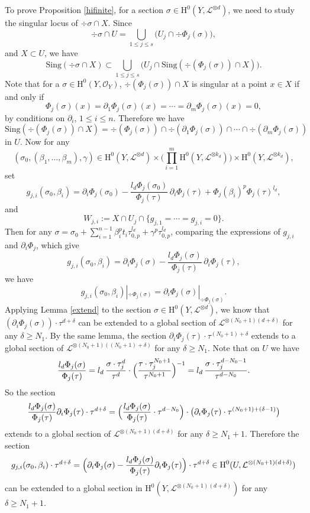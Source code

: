 \documentclass[11pt]{article}
\numberwithin{equation}{section}
\theoremstyle{plain}
\theoremstyle{definition}
\newcommand{\ho}{\mathrm{H}}
\newcommand{\li}{\mathcal{L}}
\begin{document}
To prove Proposition \ref{hifinite}, for a section $\sigma\in \ho^0(Y, \mathcal{L}^{\otimes d})$, we need to study the singular locus of $\div \sigma\cap X$. Since
\[
\div \sigma \cap U=\bigcup_{1\leq j\leq s}\bigl(U_j\cap \div \Phi_j(\sigma) \bigr),
\]
and $X\subset U$, we have
\[
\mathrm{Sing}(\div \sigma\cap X)\subset \bigcup_{1\leq j\leq s}\bigl(U_j\cap \mathrm{Sing}(\div (\Phi_j(\sigma))\cap X) \bigr).
\]
Note that for a $\sigma\in \ho^0(Y, \mathcal{O}_Y)$, $\div (\Phi_j(\sigma))\cap X$ is singular at a point $x\in X$ if and only if
\[
\Phi_j(\sigma)(x)=\partial_1\Phi_j(\sigma)(x)=\cdots=\partial_m\Phi_j(\sigma)(x)=0,
\]
by conditions on $\partial_i$, $1\leq i\leq n$. Therefore we have
\[
\mathrm{Sing}(\div (\Phi_j(\sigma))\cap X)=\div (\Phi_j(\sigma))\cap \div (\partial_1\Phi_j(\sigma))\cap\cdots\cap \div (\partial_m\Phi_j(\sigma))
\]
in $U$. Now for any
\[
(\sigma_0, (\beta_1,\dots, \beta_m), \gamma) \in \ho^0(Y,\mathcal{L}^{\otimes d})\times \biggl(\prod_{i=1}^m \ho^0(Y,\mathcal{L}^{\otimes k_d}) \biggr) \times \ho^0(Y, \mathcal{L}^{\otimes k_d}),
\]
set
\[
g_{j,i}(\sigma_0,\beta_i)=\partial_i \Phi_{j}(\sigma_0)-\frac{l_d\Phi_{j}(\sigma_0)}{\Phi_{j}(\tau)}\, \partial_i\Phi_{j}(\tau)+\Phi_{j}(\beta_i)^p\Phi_{j}(\tau)^{l_d},
\]
and
\[
W_{j,i}:=X\cap U_j\cap \{ g_{j,1}=\cdots=g_{j,i}=0 \}.
\]
Then for any $\sigma=\sigma_0+\sum_{i=1}^{n-1} \beta_i^pt_i\tau_{0,p}^{l_d}+\gamma^p\tau_{0,p}^{l_d}$, comparing the expressions of $g_{j,i}$ and $\partial_i\Phi_{j}$, which give
\[
g_{j,i}(\sigma_0,\beta_i)=\partial_i\Phi_{j}(\sigma)-\frac{l_d\Phi_j(\sigma)}{\Phi_j(\tau)}\,\partial_i\Phi_j(\tau),
\]
we have
\[
g_{j,i}(\sigma_0,\beta_i)|_{ \div \Phi_{j}(\sigma)}=\partial_i\Phi_{j}(\sigma)|_{ \div \Phi_{j}(\sigma)}.
\]
Applying Lemma \ref{extend} to the section $\sigma\in \ho^0(Y, \mathcal{L}^{\otimes d})$, we know that $\left(\partial_i \Phi_j(\sigma) \right)\cdot \tau^{d+\delta}$ can be extended to a global section of $\li^{\otimes (N_0+1)(d+\delta)}$ for any $\delta \geq N_1$. By the same lemma, the section $\partial_i\Phi_j(\tau) \cdot \tau^{(N_0+1)+\delta}$ extends to a global section of $\li^{\otimes (N_0+1)((N_0+1)+\delta)}$ for any $\delta \geq N_1$. Note that on $U$ we have
\[
\frac{l_d\Phi_j(\sigma)}{\Phi_j(\tau)}= l_d\,\frac{\sigma \cdot \tau_j^d}{\tau^d} \cdot\Bigl(\frac{\tau \cdot \tau_j^{N_0+1}}{\tau^{N_0+1}}\Bigr)^{-1}=l_d\,\frac{\sigma \cdot \tau_j^{d-N_0-1}}{\tau^{d-N_0}}.
\]
So the section
\[
\frac{l_d\Phi_j(\sigma)}{\Phi_j(\tau)}\partial_i\Phi_j(\tau)\cdot \tau^{d+\delta} = \Bigl(\frac{l_d\Phi_j(\sigma)}{\Phi_j(\tau)}\cdot \tau^{d-N_0}\Bigr)\cdot \bigl(\partial_i\Phi_j(\tau) \cdot \tau^{(N_0+1)+(\delta-1)} \bigr)
\]
extends to a global section of $\li^{\otimes (N_0+1)(d+\delta)}$ for any $\delta \geq N_1+1$.
Therefore the section
\[
g_{j,i}(\sigma_0,\beta_i)\cdot \tau^{d+\delta}=\Bigl(\partial_i\Phi_{j}(\sigma)-\frac{l_d\Phi_j(\sigma)}{\Phi_j(\tau)}\partial_i\Phi_j(\tau)\Bigr)\cdot \tau^{d+\delta}\in \ho^0(U, \li^{\otimes (N_0+1)(d+\delta)})
\]
can be extended to a global section in $\ho^0(Y, \li^{\otimes (N_0+1)(d+\delta)})$ for any $\delta\geq N_1+1$.
\end{document}
